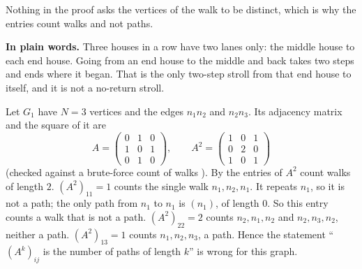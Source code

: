 Nothing in the proof asks the vertices of the walk to be distinct, which is why the entries count walks and not paths.

\plainstart\textbf{In plain words.} Three houses in a row have two lanes only: the middle house to each end house. Going from an end house to the middle and back takes two steps and ends where it began. That is the only two-step stroll from that end house to itself, and it is not a no-return stroll.\plainend
\begin{example}\label{ex:board}
Let $G_1$ have $N = 3$ vertices and the edges $n_1n_2$ and $n_2n_3$. Its adjacency matrix and the square of it are
\[
A = \begin{pmatrix} 0&1&0\\ 1&0&1\\ 0&1&0 \end{pmatrix}, \qquad
A^2 = \begin{pmatrix} 1&0&1\\ 0&2&0\\ 1&0&1 \end{pmatrix}
\]
(checked against a brute-force count of walks \cite{m1_walks_script}). By  the entries of $A^2$ count walks of length $2$.
$(A^2)_{11} = 1$ counts the single walk $n_1, n_2, n_1$. It repeats $n_1$, so it is not a path; the only path from $n_1$ to $n_1$ is $(n_1)$, of length $0$. So this entry counts a walk that is not a path.
$(A^2)_{22} = 2$ counts $n_2, n_1, n_2$ and $n_2, n_3, n_2$, neither a path.
$(A^2)_{13} = 1$ counts $n_1, n_2, n_3$, a path.
Hence the statement ``$(A^k)_{ij}$ is the number of paths of length $k$'' is wrong for this graph.
\end{example}
